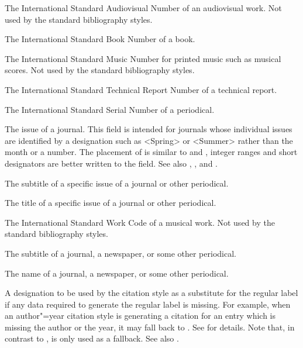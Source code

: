 \documentclass{ltxdockit}[2011/03/25]
\begin{document}
\begin{fieldlist}

The International Standard Audiovisual Number of an audiovisual work. Not used by the standard bibliography styles.


The International Standard Book Number of a book.


The International Standard Music Number for printed music such as musical scores. Not used by the standard bibliography styles.


The International Standard Technical Report Number of a technical report.


The International Standard Serial Number of a periodical.


The issue of a journal. This field is intended for journals whose individual issues are identified by a designation such as <Spring> or <Summer> rather than the month or a number. The placement of  is similar to  and , integer ranges and short designators are better written to the  field. See also , , and .


The subtitle of a specific issue of a journal or other periodical.


The title of a specific issue of a journal or other periodical.


The International Standard Work Code of a musical work. Not used by the standard bibliography styles.


The subtitle of a journal, a newspaper, or some other periodical.


The name of a journal, a newspaper, or some other periodical.


A designation to be used by the citation style as a substitute for the regular label if any data required to generate the regular label is missing. For example, when an author"=year citation style is generating a citation for an entry which is missing the author or the year, it may fall back to . See  for details. Note that, in contrast to ,  is only used as a fallback. See also .


\end{fieldlist}
\end{document}
